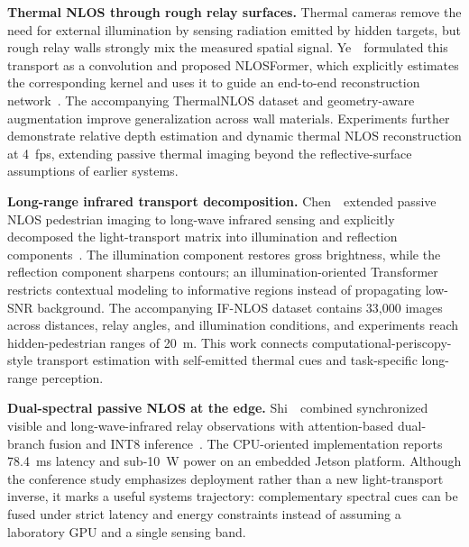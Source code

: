 \vspace{0.8mm}
\noindent \textbf{Thermal NLOS through rough relay surfaces.}
Thermal cameras remove the need for external illumination by sensing radiation emitted by hidden targets, but rough relay walls strongly mix the measured spatial signal. Ye~\etal~formulated this transport as a convolution and proposed NLOSFormer, which explicitly estimates the corresponding kernel and uses it to guide an end-to-end reconstruction network~\cite{yeThermalNLOSFormer2026}. The accompanying ThermalNLOS dataset and geometry-aware augmentation improve generalization across wall materials. Experiments further demonstrate relative depth estimation and dynamic thermal NLOS reconstruction at 4~fps, extending passive thermal imaging beyond the reflective-surface assumptions of earlier systems.



\vspace{0.8mm}
\noindent \textbf{Long-range infrared transport decomposition.}
Chen~\etal~extended passive NLOS pedestrian imaging to long-wave infrared sensing and explicitly decomposed the light-transport matrix into illumination and reflection components~\cite{chenLTMDPassiveNLOS2025}. The illumination component restores gross brightness, while the reflection component sharpens contours; an illumination-oriented Transformer restricts contextual modeling to informative regions instead of propagating low-SNR background. The accompanying IF-NLOS dataset contains 33,000 images across distances, relay angles, and illumination conditions, and experiments reach hidden-pedestrian ranges of 20~m. This work connects computational-periscopy-style transport estimation with self-emitted thermal cues and task-specific long-range perception.

\vspace{0.8mm}
\noindent \textbf{Dual-spectral passive NLOS at the edge.}
Shi~\etal~combined synchronized visible and long-wave-infrared relay observations with attention-based dual-branch fusion and INT8 inference~\cite{shiDualSpectralEdgeNLOS2026}. The CPU-oriented implementation reports 78.4~ms latency and sub-10~W power on an embedded Jetson platform. Although the conference study emphasizes deployment rather than a new light-transport inverse, it marks a useful systems trajectory: complementary spectral cues can be fused under strict latency and energy constraints instead of assuming a laboratory GPU and a single sensing band.


